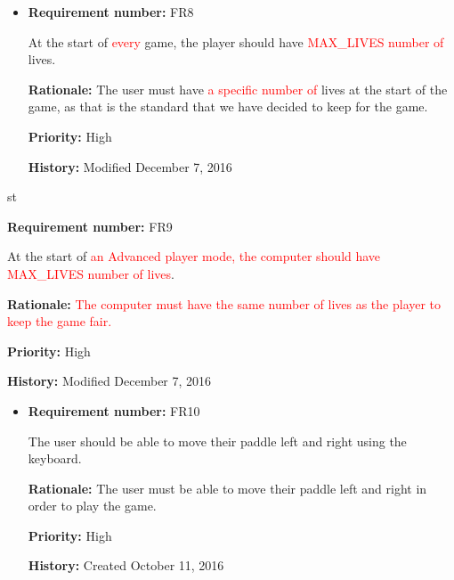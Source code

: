 \documentclass[12pt,letterpaper]{article}
\begin{document}
\begin{reqbox}
	\begin{itemize}
		\item \textbf{Requirement number: }FR8

		At the start of \textcolor{red}{every} game, the player should have\textcolor{red}{ MAX_LIVES number of}  lives.

		\textbf{Rationale: }The user must have \textcolor{red}{a specific number of} lives at the start of the game, as that is the standard that we have decided to keep for the game.

		\textbf{Priority: }High

		\textbf{History: }Modified December 7, 2016
	\end{itemize}
\end{reqbox}

\begin{reqbox}
	\begin{itemize}
st{
		\item \textbf{Requirement number: }FR9

		At the start of \textcolor{red}{an Advanced player mode, the computer should have MAX_LIVES number of lives}.

		\textbf{Rationale: }\textcolor{red}{The computer must have the same number of lives as the player to keep the game fair.}

		\textbf{Priority: }High

		\textbf{History: }Modified December 7, 2016
}
	\end{itemize}
\end{reqbox}

\begin{reqbox}
	\begin{itemize}
		\item \textbf{Requirement number: }FR10

		The user should be able to move their paddle left and right using the keyboard.

		\textbf{Rationale:} The user must be able to move their paddle left and right in order to play the game.

		\textbf{Priority: }High

		\textbf{History: }Created October 11, 2016
	\end{itemize}
\end{reqbox}
\end{document}
